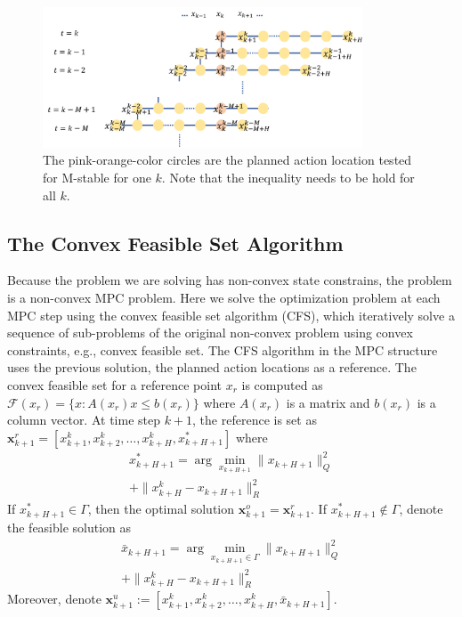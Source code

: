 \documentclass{ifacconf}
\begin{document}
\begin{figure}[htbp]
\begin{center}
\includegraphics[width=9.5cm]{src/Mstable.png}
\caption{The pink-orange-color circles are the planned action location tested for M-stable for one $k$. Note that the inequality needs to be hold for all $k$.}
\label{fig: mpc}
\end{center}
\end{figure}


\subsection{The Convex Feasible Set Algorithm}
Because the problem we are solving has non-convex state constrains, the problem is a non-convex MPC problem. Here we solve the optimization problem at each MPC step using the convex feasible set algorithm (CFS), which iteratively solve a sequence of sub-problems of the original non-convex problem using convex constraints, e.g., convex feasible set. The CFS algorithm in the MPC structure uses the previous solution, the planned action locations as a reference. The convex feasible set for a reference point $x_r$ is computed as $\mathcal{F}(x_r) = \{x:A(x_r)x\leq b(x_r)\}$ where $A(x_r)$ is a matrix and $b(x_r)$ is a column vector. 
At time step $k+1$, the reference is set as $\mathbf{x}_{k+1}^{r}=[x_{k+1}^{k},x_{k+2}^{k},\ldots,x_{k+H}^k, x_{k+H+1}^*]$ where
\begin{eqnarray}
x_{k+H+1}^* = \arg\min_{x_{k+H+1}} \|x_{k+H+1}\|_Q^2\\+\|x_{k+H}^k-x_{k+H+1}\|_R^2
\end{eqnarray}
If $x_{k+H+1}^*\in\Gamma$, then the optimal solution $\mathbf{x}_{k+1}^o = \mathbf{x}_{k+1}^r$.  If $x_{k+H+1}^*\notin\Gamma$, denote the feasible solution as 
\begin{eqnarray}
\bar{x}_{k+H+1} = \arg\min_{x_{k+H+1}\in\Gamma} \|x_{k+H+1}\|_Q^2\\
+\|x_{k+H}^k-x_{k+H+1}\|_R^2
\end{eqnarray}
Moreover, denote $\mathbf{x}_{k+1}^{u}:=[x_{k+1}^{k},x_{k+2}^{k},\ldots,x_{k+H}^k, \bar x_{k+H+1}]$. 
\end{document}
